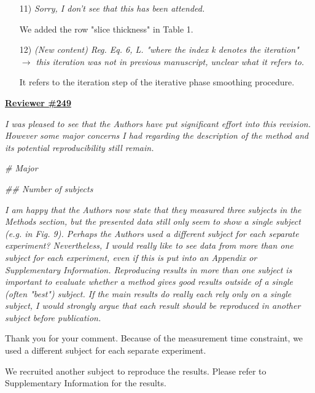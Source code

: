 \documentclass[a4paper,11pt,twoside]{report}
\begin{document}
\begin{enumerate}
    \item [11)] \textit{Sorry, I don't see that this has been attended.}

    \hspace{1em} {\color{blue} We added the row "slice thickness" in Table 1.}

    \item [12)] \textit{(New content) Reg. Eq. 6, L. "where the index k denotes the iteration" $\rightarrow$ this iteration was not in previous manuscript, unclear what it refers to.}

    \hspace{1em} {\color{blue} It refers to the iteration step
    of the iterative phase smoothing procedure.}

\end{enumerate}


\clearpage
\noindent \underline{\textbf{Reviewer \#249}}

\textit{I was pleased to see that
the Authors have put significant effort into this revision.
However some major concerns I had
regarding the description of the method and
its potential reproducibility still remain.}

\vspace{1em}

\noindent \textit{\# Major}

\vspace{1em}

\noindent \textit{\#\# Number of subjects}

\textit{I am happy that the Authors now state that they measured three subjects in the Methods section, but the presented data still only seem to show a single subject (e.g. in Fig. 9). Perhaps the Authors used a different subject for each separate experiment? Nevertheless, I would really like to see data from more than one subject for each experiment, even if this is put into an Appendix or Supplementary Information. Reproducing results in more than one subject is important to evaluate whether a method gives good results outside of a single (often "best") subject. If the main results do really each rely only on a single subject, I would strongly argue that each result should be reproduced in another subject before publication.}

    {\color{blue} Thank you for your comment.
    Because of the measurement time constraint,
    we used a different subject for each separate experiment.

    We recruited another subject to reproduce the results.
    Please refer to Supplementary Information for the results.}
\end{document}
